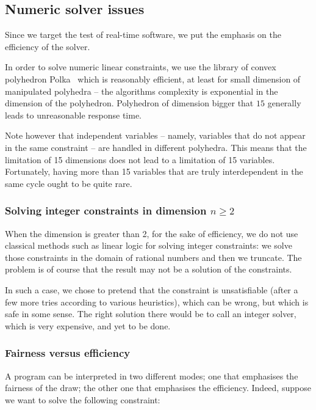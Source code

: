 \subsection{Numeric solver issues}
\label{lucky-numeric-solver}

Since we target the test of real-time software, we put the emphasis
on the efficiency of the solver.


In order to  solve numeric linear constraints, we  use the library of
convex  polyhedron  {\sc   Polka}~\cite{polka}  which  is  reasonably
efficient, at  least for small dimension of  manipulated polyhedra --
the  algorithms complexity  is exponential  in the  dimension  of the
polyhedron. Polyhedron of dimension  bigger that $15$ generally leads
to unreasonable response time.

Note however that independent  variables -- namely, variables that do
not  appear  in the  same  constraint  --  are handled  in  different
polyhedra. This means  that the limitation of 15  dimensions does not
lead to a limitation of  15 variables.  Fortunately, having more than
15 variables that are truly interdependent in the same cycle ought to
be quite rare.


\subsubsection{Solving integer constraints in dimension $n \geq 2$}
When the dimension is greater than  2, for the sake of efficiency, we
do not use classical methods such as linear logic for solving integer
constraints:  we solve those  constraints in  the domain  of rational
numbers  and then we  truncate.  The  problem is  of course  that the
result may not be a solution of the constraints.

In  such  a  case,  we  chose  to  pretend  that  the  constraint  is
unsatisfiable  (after   a  few   more  tries  according   to  various
heuristics), which can be wrong, but which is safe in some sense. The
right solution  there would  be to call  an integer solver,  which is
very expensive, and yet to be done.


\subsubsection{Fairness versus efficiency}

A \lutin program can be  interpreted in two different modes; one that
emphasises the  fairness of the  draw; the other one  that emphasises
the  efficiency.  Indeed,  suppose  we want  to  solve the  following
constraint:

